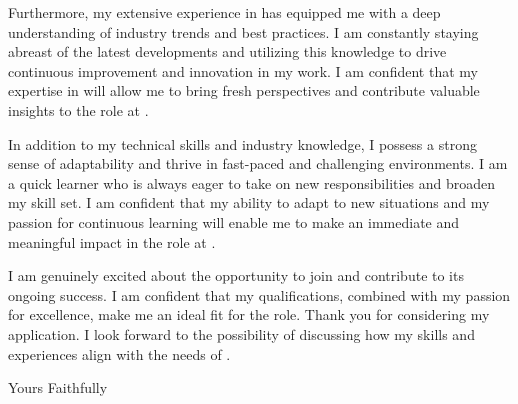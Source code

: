 \documentclass[11pt,a4]{article}
\begin{document}
Furthermore, my extensive experience in \currentjob{} has equipped me with a deep understanding of industry trends and best practices. I am constantly staying abreast of the latest developments and utilizing this knowledge to drive continuous improvement and innovation in my work. I am confident that my expertise in \currentjob{} will allow me to bring fresh perspectives and contribute valuable insights to the \position{} role at \company{}.

In addition to my technical skills and industry knowledge, I possess a strong sense of adaptability and thrive in fast-paced and challenging environments. I am a quick learner who is always eager to take on new responsibilities and broaden my skill set. I am confident that my ability to adapt to new situations and my passion for continuous learning will enable me to make an immediate and meaningful impact in the \position{} role at \company{}.

I am genuinely excited about the opportunity to join \company{} and contribute to its ongoing success. I am confident that my qualifications, combined with my passion for excellence, make me an ideal fit for the \position{} role. Thank you for considering my application. I look forward to the possibility of discussing how my skills and experiences align with the needs of \company{}.



\vspace{0.5cm}
\raggedright
Yours Faithfully \\ \name \\ \phone \\ \href{mailto:\email}{\email}
\end{document}
